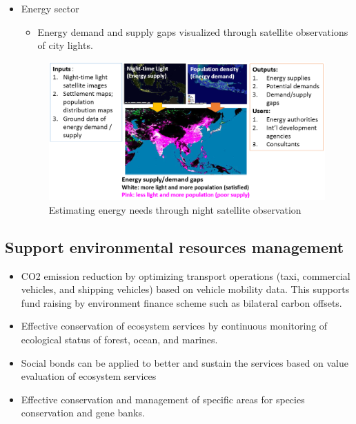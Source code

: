 \begin{itemize}
\item Energy sector

\begin{itemize}
\item Energy demand and supply gaps visualized through satellite observations of city lights.
\end{itemize}

\begin{figure}[H]
\begin{center}
\includegraphics[width = 0.8\linewidth]{Figures/energy.png}
\end{center}
\caption{Estimating energy needs through night satellite observation}
\label{manufacturing_service}
\end{figure}

\end{itemize}

\subsection{Support environmental resources management}

\begin{itemize}

\item CO2 emission reduction by optimizing transport operations (taxi, commercial vehicles, and shipping vehicles) based on vehicle mobility data. This supports fund raising by environment finance scheme such as bilateral carbon offsets.

\item Effective conservation of ecosystem services by continuous monitoring of ecological status of forest, ocean, and marines.

\item Social bonds can be applied to better and sustain the services based on value evaluation of ecosystem services

\item Effective conservation and management of specific areas for species conservation and gene banks.

\end{itemize}

